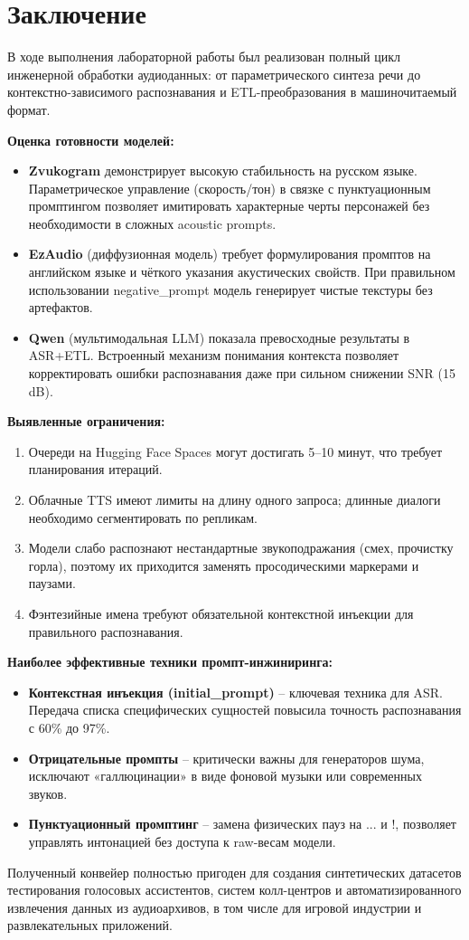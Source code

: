 \documentclass[oneside,a4paper,14pt]{extarticle}
\begin{document}
\section*{Заключение}
\noindent В ходе выполнения лабораторной работы был реализован полный цикл инженерной обработки аудиоданных: от параметрического синтеза речи до контекстно-зависимого распознавания и ETL-преобразования в машиночитаемый формат.

\noindent\textbf{Оценка готовности моделей:}
\begin{itemize}
    \item \textbf{Zvukogram} демонстрирует высокую стабильность на русском языке. Параметрическое управление (скорость/тон) в связке с пунктуационным промптингом позволяет имитировать характерные черты персонажей без необходимости в сложных acoustic prompts.
    \item \textbf{EzAudio} (диффузионная модель) требует формулирования промптов на английском языке и чёткого указания акустических свойств. При правильном использовании negative\_prompt модель генерирует чистые текстуры без артефактов.
    \item \textbf{Qwen} (мультимодальная LLM) показала превосходные результаты в ASR+ETL. Встроенный механизм понимания контекста позволяет корректировать ошибки распознавания даже при сильном снижении SNR (15 dB).
\end{itemize}

\noindent\textbf{Выявленные ограничения:}
\begin{enumerate}
    \item Очереди на Hugging Face Spaces могут достигать 5–10 минут, что требует планирования итераций.
    \item Облачные TTS имеют лимиты на длину одного запроса; длинные диалоги необходимо сегментировать по репликам.
    \item Модели слабо распознают нестандартные звукоподражания (смех, прочистку горла), поэтому их приходится заменять просодическими маркерами и паузами.
    \item Фэнтезийные имена требуют обязательной контекстной инъекции для правильного распознавания.
\end{enumerate}

\noindent\textbf{Наиболее эффективные техники промпт-инжиниринга:}
\begin{itemize}
    \item \textbf{Контекстная инъекция (initial\_prompt)} -- ключевая техника для ASR. Передача списка специфических сущностей повысила точность распознавания с 60\% до 97\%.
    \item \textbf{Отрицательные промпты} -- критически важны для генераторов шума, исключают «галлюцинации» в виде фоновой музыки или современных звуков.
    \item \textbf{Пунктуационный промптинг} -- замена физических пауз на ... и !, позволяет управлять интонацией без доступа к raw-весам модели.
\end{itemize}
\noindent Полученный конвейер полностью пригоден для создания синтетических датасетов тестирования голосовых ассистентов, систем колл-центров и автоматизированного извлечения данных из аудиоархивов, в том числе для игровой индустрии и развлекательных приложений.
\end{document}
